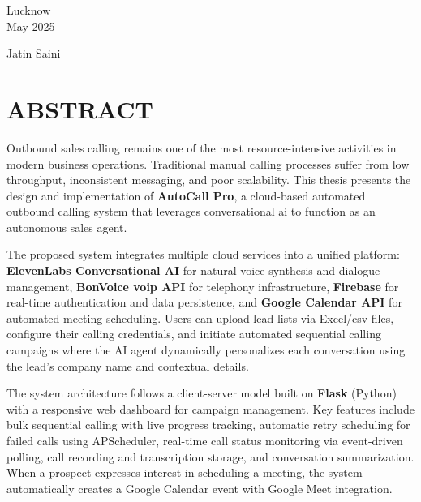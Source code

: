 \documentclass[12pt,a4paper,oneside]{book}
\begin{document}
\vspace{2cm}

\noindent
\begin{minipage}[t]{0.45\textwidth}
Lucknow\\
May 2025
\end{minipage}
\hfill
\begin{minipage}[t]{0.35\textwidth}
\raggedleft
Jatin Saini
\end{minipage}

\newpage\thispagestyle{empty}\mbox{}\newpage

\chapter*{ABSTRACT}

Outbound sales calling remains one of the most resource-intensive activities in modern business operations. Traditional manual calling processes suffer from low throughput, inconsistent messaging, and poor scalability. This thesis presents the design and implementation of \textbf{AutoCall Pro}, a cloud-based automated outbound calling system that leverages conversational \gls{ai} to function as an autonomous sales agent.

The proposed system integrates multiple cloud services into a unified platform: \textbf{ElevenLabs Conversational AI} for natural voice synthesis and dialogue management, \textbf{BonVoice \gls{voip} API} for telephony infrastructure, \textbf{Firebase} for real-time authentication and data persistence, and \textbf{Google Calendar API} for automated meeting scheduling. Users can upload lead lists via Excel/\gls{csv} files, configure their calling credentials, and initiate automated sequential calling campaigns where the AI agent dynamically personalizes each conversation using the lead's company name and contextual details.

The system architecture follows a client-server model built on \textbf{Flask} (Python) with a responsive web dashboard for campaign management. Key features include bulk sequential calling with live progress tracking, automatic retry scheduling for failed calls using APScheduler, real-time call status monitoring via event-driven polling, call recording and transcription storage, and conversation summarization. When a prospect expresses interest in scheduling a meeting, the system automatically creates a Google Calendar event with Google Meet integration.
\end{document}
